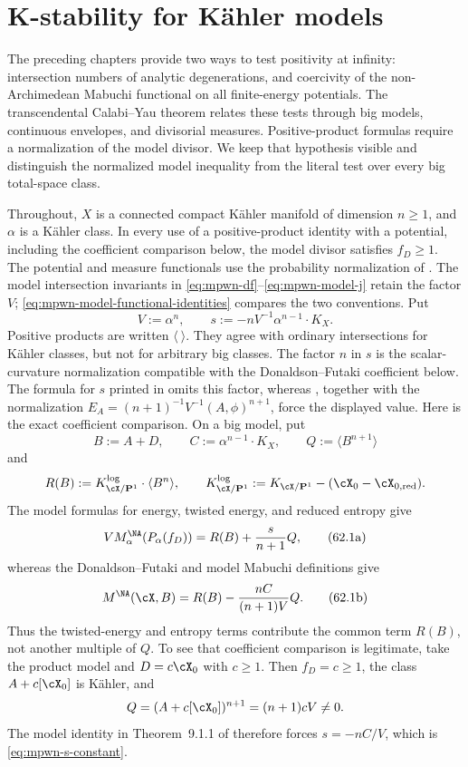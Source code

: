 \chapter{K-stability for K\"ahler models}
\label{chap:mpwn-k-stability}

The preceding chapters provide two ways to test positivity at infinity:
intersection numbers of analytic degenerations, and coercivity of the
non-Archimedean Mabuchi functional on all finite-energy potentials.  The
transcendental Calabi--Yau theorem relates these tests through big models,
continuous envelopes, and divisorial measures.  Positive-product formulas
require a normalization of the model divisor.  We keep that hypothesis
visible and distinguish the normalized model inequality from the literal
test over every big total-space class.

Throughout, $X$ is a connected compact K\"ahler manifold of dimension
$n\geq1$, and $\alpha$ is a K\"ahler class.  In every use of a
positive-product identity with a potential, including the coefficient
comparison below, the model divisor satisfies $f_D\geq1$.
The potential and measure functionals use the probability normalization of
. The model intersection invariants in
\eqref{eq:mpwn-df}--\eqref{eq:mpwn-model-j} retain the factor $V$;
\eqref{eq:mpwn-model-functional-identities} compares the two conventions.
Put
\[
                    V:=\alpha^n,\qquad
                    s:=-nV^{-1}\alpha^{n-1}\cdot K_X.
\tag{62.1}\label{eq:mpwn-s-constant}
\]
Positive products are written \(\langle\ \rangle\).  They agree with
ordinary intersections for K\"ahler classes, but not for arbitrary big
classes.  The factor \(n\) in \(s\) is the scalar-curvature normalization
compatible with the Donaldson--Futaki coefficient below.  The formula for
\(s\) printed in \cite[Section~2.4.2]{MPWN25} omits this factor, whereas
\cite[Definition~1.1.1 and Theorem~9.1.1]{MPWN25}, together with the
normalization \(E_A=(n+1)^{-1}V^{-1}(A,\phi)^{n+1}\), force the displayed
value.  Here is the exact coefficient comparison.  On a big model, put
\[
 B:=A+D,\qquad C:=\alpha^{n-1}\cdot K_X,\qquad
 Q:=\langle B^{n+1}\rangle
\]
and
\[
 R(B):=K^{\log}_{\cX/\mathbf P^1}\cdot\langle B^n\rangle,\qquad
 K^{\log}_{\cX/\mathbf P^1}
 :=K_{\cX/\mathbf P^1}-(\cX_0-\cX_{0,\mathrm{red}}).
\]
The model formulas for energy, twisted energy, and reduced entropy give
\[
 V M_\alpha^{\NA}(P_\alpha(f_D))
       =R(B)+\frac{s}{n+1}Q,
\tag{62.1a}\label{eq:mpwn-factor-n-potential-side}
\]
whereas the Donaldson--Futaki and model Mabuchi definitions give
\[
 M^{\NA}(\cX,B)
       =R(B)-\frac{nC}{(n+1)V}Q.
\tag{62.1b}\label{eq:mpwn-factor-n-model-side}
\]
Thus the twisted-energy and entropy terms contribute the common term
\(R(B)\), not another multiple of \(Q\).  To see that coefficient comparison
is legitimate, take the product model and
\(D=c\cX_0\) with \(c\geq1\).  Then \(f_D=c\geq1\), the class
\(A+c[\cX_0]\) is K\"ahler, and
\[
       Q=(A+c[\cX_0])^{n+1}=(n+1)cV\ne0.
\]
The model identity in Theorem~9.1.1 of \cite{MPWN25} therefore forces
\(s=-nC/V\), which is \eqref{eq:mpwn-s-constant}.

